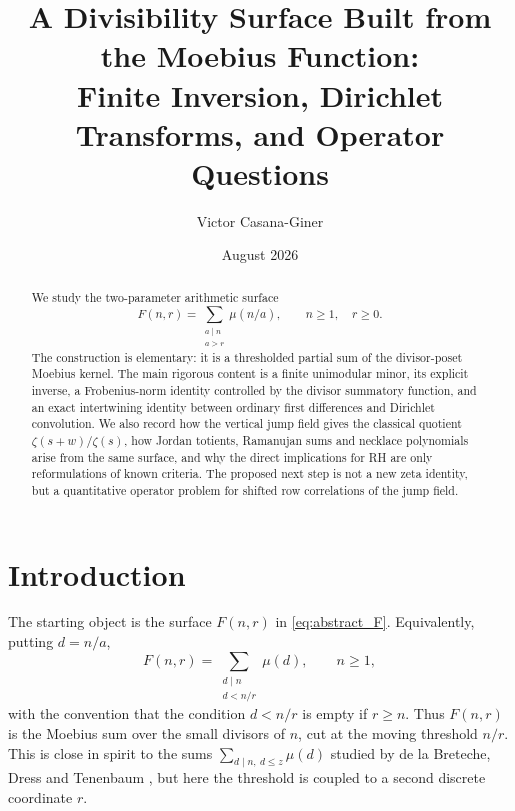 \documentclass[11pt]{amsart}
\title{A Divisibility Surface Built from the Moebius Function:\\Finite Inversion, Dirichlet Transforms, and Operator Questions}
\author{Victor Casana-Giner}
\date{August 2026}
\numberwithin{equation}{section}
\theoremstyle{plain}
\theoremstyle{definition}
\theoremstyle{remark}
\newcommand{\mob}{\mu}
\newcommand{\zetaR}{\zeta}
\newcommand{\Fsurf}{F}
\begin{document}
\pagestyle{plain}

\begin{abstract}
We study the two-parameter arithmetic surface
\begin{equation}
\Fsurf(n,r)=\sum_{\substack{a\mid n\\ a>r}}\mob(n/a),
\qquad n\ge 1,\quad r\ge 0.
\label{eq:abstract_F}
\end{equation}
The construction is elementary: it is a thresholded partial sum of the divisor-poset Moebius kernel.  The main rigorous content is a finite unimodular minor, its explicit inverse, a Frobenius-norm identity controlled by the divisor summatory function, and an exact intertwining identity between ordinary first differences and Dirichlet convolution.  We also record how the vertical jump field gives the classical quotient \(\zetaR(s+w)/\zetaR(s)\), how Jordan totients, Ramanujan sums and necklace polynomials arise from the same surface, and why the direct implications for RH are only reformulations of known criteria.  The proposed next step is not a new zeta identity, but a quantitative operator problem for shifted row correlations of the jump field.
\end{abstract}

\maketitle
\tableofcontents
\bigskip



\section{Introduction}
\label{sec:introduction}

The starting object is the surface \(\Fsurf(n,r)\) in \eqref{eq:abstract_F}.  Equivalently, putting \(d=n/a\),
\begin{equation}
\Fsurf(n,r)=\sum_{\substack{d\mid n\\ d<n/r}}\mob(d),
\qquad n\ge 1,
\label{eq:F_small_divisor_form}
\end{equation}
with the convention that the condition \(d<n/r\) is empty if \(r\ge n\).  Thus \(\Fsurf(n,r)\) is the Moebius sum over the small divisors of \(n\), cut at the moving threshold \(n/r\).  This is close in spirit to the sums \(\sum_{d\mid n,\ d\le z}\mob(d)\) studied by de la Breteche, Dress and Tenenbaum \cite{BretcheDressTenenbaum2020}, but here the threshold is coupled to a second discrete coordinate \(r\).
\end{document}
